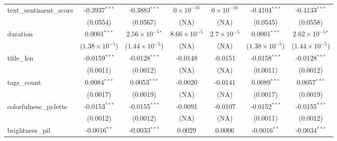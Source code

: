 \begin{table}[htbp]
\begin{tabular}{lcccccc}
      text\_sentiment\_score         & -0.3937$^{***}$                & -0.3883$^{***}$               & $0\times 10^{-16}$     & $0\times 10^{-16}$   & -0.4104$^{***}$                & -0.4133$^{***}$\\   
                                     & (0.0554)                       & (0.0567)                      & (NA)                   & (NA)                 & (0.0545)                       & (0.0558)\\   
      duration                       & 0.0001$^{***}$                 & $2.56\times 10^{-5}$$^{*}$    & $8.66\times 10^{-5}$   & $2.7\times 10^{-5}$  & 0.0001$^{***}$                 & $2.62\times 10^{-5}$$^{*}$\\    
                                     & ($1.38\times 10^{-5}$)         & ($1.44\times 10^{-5}$)        & (NA)                   & (NA)                 & ($1.38\times 10^{-5}$)         & ($1.44\times 10^{-5}$)\\    
      title\_len                     & -0.0159$^{***}$                & -0.0128$^{***}$               & -0.0148                & -0.0151              & -0.0158$^{***}$                & -0.0128$^{***}$\\   
                                     & (0.0011)                       & (0.0012)                      & (NA)                   & (NA)                 & (0.0011)                       & (0.0012)\\   
      tags\_count                    & 0.0084$^{***}$                 & 0.0053$^{***}$                & -0.0020                & -0.0141              & 0.0089$^{***}$                 & 0.0057$^{***}$\\   
                                     & (0.0017)                       & (0.0019)                      & (NA)                   & (NA)                 & (0.0017)                       & (0.0019)\\   
      colorfulness\_pylette          & -0.0153$^{***}$                & -0.0155$^{***}$               & -0.0091                & -0.0107              & -0.0152$^{***}$                & -0.0155$^{***}$\\   
                                     & (0.0012)                       & (0.0012)                      & (NA)                   & (NA)                 & (0.0011)                       & (0.0012)\\   
      brightness\_pil                & -0.0016$^{**}$                 & -0.0033$^{***}$               & 0.0029                 & 0.0006               & -0.0016$^{**}$                 & -0.0034$^{***}$\\   

\end{tabular}
\end{table}
